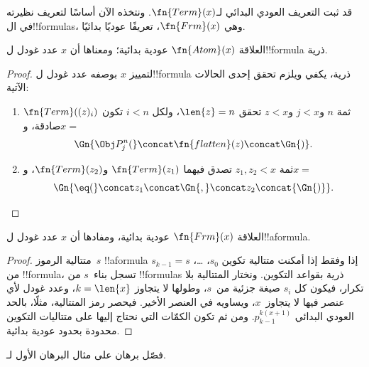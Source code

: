 \documentclass[../../../include/open-logic-section]{subfiles}
\begin{document}

قد ثبت التعريف العودي البدائي لـ$\fn{Term}(x)$.
ونتخذه الآن أساسًا لتعريف نظيرته في
ال!!{formula}s، وهي $\fn{Frm}(x)$،
تعريفًا عوديًا بدائيًا.

\begin{prop}
العلاقة $\fn{Atom}(x)$ عودية بدائية؛ ومعناها أن $x$
عدد غودل ل!!{formula} ذرية.
\end{prop}

\begin{proof}
لتمييز $x$ بوصفه عدد غودل ل!!{formula} ذرية،
يكفي ويلزم تحقق إحدى الحالات الآتية:
\begin{enumerate}
\item ثمة $n$ و$j<x$ و$z<x$ تحقق $\len{z}=n$، ولكل $i<n$ تكون
  $\fn{Term}((z)_i)$ صادقة، و$x=$
\[
\Gn{\Obj P^n_j(} \concat \fn{flatten}(z) \concat \Gn{)}.
\]
\item ثمة $z_1,z_2<x$ تصدق فيهما $\fn{Term}(z_1)$ و$\fn{Term}(z_2)$،
  و$x=$
\[
\Gn{{\eq}(} \concat z_1 \concat \Gn{,} \concat z_2 \concat{\Gn{)}}.
\]
\end{enumerate}
\end{proof}

\begin{prop}
العلاقة $\fn{Frm}(x)$ عودية بدائية، ومفادها أن $x$
عدد غودل ل!!a{formula}.
\end{prop}

\begin{proof}
متتالية الرموز~$s$ !!a{formula} إذا وفقط إذا
أمكنت متتالية تكوين $s_0$، \dots،
$s_{k-1}=s$ من !!{formula}، تسجل
بناء~$s$ من !!{formula}s ذرية بقواعد
التكوين. ونختار المتتالية بلا تكرار،
فيكون كل $s_i$ صيغة جزئية من~$s$،
وطولها لا يتجاوز $k=\len{x}$،
وعدد غودل لأي عنصر فيها لا يتجاوز~$x$،
ويساويه في العنصر الأخير. فيحصر رمز
المتتالية، مثلًا، بالحد العودي البدائي
$p_{k-1}^{k(x+1)}$. ومن ثم تكون
الكمّات التي نحتاج إليها على متتاليات
التكوين محدودة بحدود عودية بدائية.
\end{proof}

\begin{prob}
فصّل برهان  على مثال
البرهان الأول لـ.
\end{prob}
\end{document}
